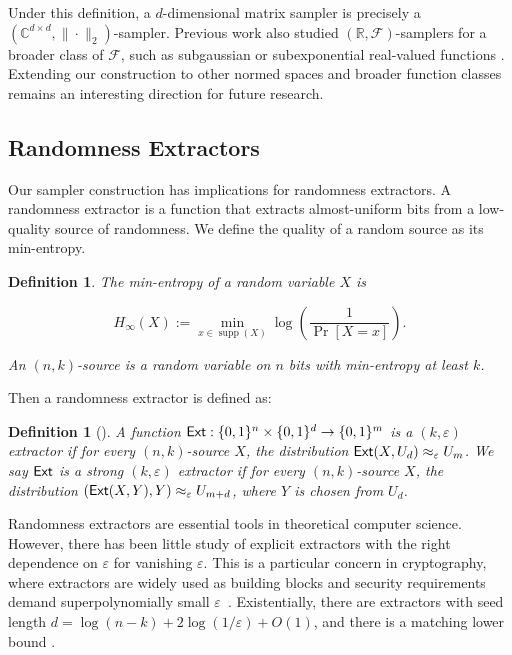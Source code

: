 \documentclass[11pt,letterpaper]{article}
\newtheorem{definition}[theorem]{Definition}
\newcommand{\C}{\mathbb{C}}
\newcommand{\R}{\mathbb{R}}
\DeclareMathOperator*{\supp}{supp}
\newcommand{\eps}{\varepsilon}
\newcommand{\1}{\mathbbm{1}}
\newcommand{\Ext}{\textup{\textsf{Ext}}}
\begin{document}
Under this definition, a \(d\)-dimensional matrix sampler is precisely a \((\C^{d\times d},\|\cdot\|_2)\)-sampler. Previous work also studied $(\R, \mathcal{F})$-samplers for a broader class of $\mathcal{F}$, such as subgaussian or subexponential real-valued functions \cite{Bla19,Agr19}. Extending our construction to other normed spaces and broader function classes remains an interesting direction for future research.


 \subsection{Randomness Extractors}

 
Our sampler construction has implications for randomness extractors.
A randomness extractor is a function that extracts almost-uniform bits from a low-quality source of randomness. We define the quality of a random source as its min-entropy.
\begin{definition}
    The min-entropy of a random variable $X$ is 
    
    \[ H_{\infty}(X) := \min_{x \in \supp(X)} \log\left(\frac{1}{\Pr[X = x]}\right). \]


An $(n,k)$-source is a random variable on $n$ bits with min-entropy at least $k$.
\end{definition}

Then a randomness extractor is defined as:

\begin{definition}[\cite{Nisan_Zuckerman}]
A function $\Ext : \{0,1\}^n \times \{0,1\}^d \rightarrow \{0,1\}^m$ is a $(k,\varepsilon)$ extractor if for every $(n,k)$-source $X$, the distribution $\Ext(X,U_d) \approx_{\varepsilon} U_m$. We say $\Ext$ is a \emph{strong} $(k,\varepsilon)$ extractor if for every $(n,k)$-source $X$, the distribution $(\Ext(X,Y), Y) \approx_{\varepsilon} U_{m+d}$, where $Y$ is chosen from $U_d$.
\end{definition}
 
Randomness extractors are essential tools in theoretical computer science. However, there has been little study of explicit extractors with the right dependence on $\eps$ for vanishing $\eps$. 
This is a particular concern in cryptography, where extractors are widely used as building blocks and security requirements demand superpolynomially small $\eps$~\cite{Lu2002, Vadhan2003, Canetti2000, Dodis2002, Kalai2008, Kalai2009, Dodis2009}. 
Existentially, there are extractors with seed length $d = \log(n - k) + 2 \log(1 / \eps) + O(1)$, and there is a matching lower bound \cite{RT00}. 
\end{document}
